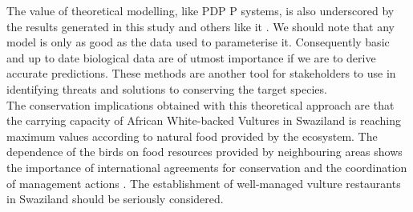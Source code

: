 The value of theoretical modelling, like PDP P systems, is also underscored by the results generated in this study and others like it \citep{margalida2012modelling,margalida2011can}. We should note that any model is only as good as the data used to parameterise it. Consequently basic and up to date biological data are of utmost importance if we are to derive accurate predictions. These methods are another tool for stakeholders to use in identifying threats and solutions to conserving the target species. \\
\indent
The conservation implications obtained with this theoretical approach are that the carrying capacity of African White-backed Vultures in Swaziland is reaching maximum values according to natural food provided by the ecosystem. The dependence of the birds on food resources provided by neighbouring areas shows the importance of international agreements for conservation and the coordination of management actions \citep{lambertucci2014apex}. The establishment of well-managed vulture restaurants in Swaziland should be seriously considered. 



